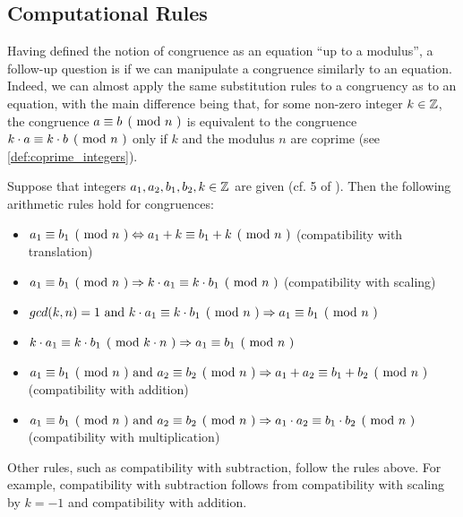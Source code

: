 \subsection{Computational Rules} Having defined the notion of congruence as an equation ``up to a modulus'', a follow-up question is if we can manipulate a congruence similarly to an equation. Indeed, we can almost apply the same substitution rules to a congruency as to an equation, with the main difference being that, for some non-zero integer $k\in \mathbb{Z}$, the congruence $\kongru{a}{b}{n}$ is equivalent to the congruence $\kongru{k\cdot a}{k\cdot b}{n}$ only if $k$ and the modulus $n$ are coprime (see \ref{def:coprime_integers}). 

Suppose that integers $a_1,a_2,b_1,b_2, k\in\mathbb{Z}$ are given (cf. \chaptname{} 5 of \cite{hardy-2008}). Then the following arithmetic rules hold for congruences:
\begin{itemize}
\label{def:modular_arithmetic_rules}
\item $\kongru{a_1}{b_1}{n}\Leftrightarrow \kongru{a_1+k}{b_1+k}{n}$ (compatibility with translation)
\item $\kongru{a_1}{b_1}{n}\Rightarrow\kongru{k\cdot a_1}{k\cdot b_1}{n}$ (compatibility with scaling)
\item $gcd(k,n)=1 \text{ and } \kongru{k\cdot a_1}{k\cdot b_1}{n}\Rightarrow \kongru{a_1}{b_1}{n}$
\item $\kongru{k\cdot a_1}{k\cdot b_1}{k\cdot n}\Rightarrow\kongru{a_1}{b_1}{n}$
\item $\kongru{a_1}{b_1}{n}\text{ and } \kongru{a_2}{b_2}{n}\Rightarrow \kongru{a_1+a_2}{b_1+b_2}{n}$ (compatibility with addition)
\item $\kongru{a_1}{b_1}{n}\text{ and } \kongru{a_2}{b_2}{n}\Rightarrow\kongru{a_1\cdot a_2}{b_1\cdot b_2}{n}$ (compatibility with multiplication)
\end{itemize}
Other rules, such as compatibility with subtraction, follow the rules above. For example, compatibility with subtraction follows from compatibility with scaling by $k=-1$ and compatibility with addition.

